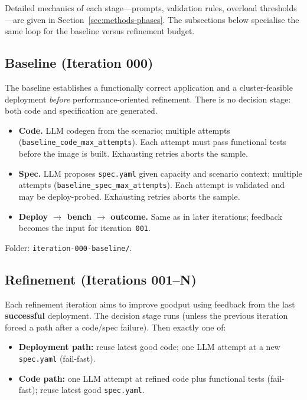 Detailed mechanics of each stage---prompts, validation rules, overload
thresholds---are given in Section~\ref{sec:methods-phases}.  The subsections
below specialise the same loop for the baseline versus refinement budget.


\subsection{Baseline (Iteration 000)}

The baseline establishes a functionally correct application and a
cluster-feasible deployment \emph{before} performance-oriented refinement.
There is no decision stage: both code and specification are generated.

\begin{itemize}
  \item \textbf{Code.} LLM codegen from the scenario; multiple attempts
        (\texttt{baseline\_code\_max\_attempts}).  Each attempt must pass
        functional tests before the image is built.  Exhausting retries aborts
        the sample.
  \item \textbf{Spec.} LLM proposes \texttt{spec.yaml} given capacity and
        scenario context; multiple attempts
        (\texttt{baseline\_spec\_max\_attempts}).  Each attempt is validated
        and may be deploy-probed.  Exhausting retries aborts the sample.
  \item \textbf{Deploy $\to$ bench $\to$ outcome.} Same as in later iterations;
        feedback becomes the input for iteration~\texttt{001}.
\end{itemize}

Folder: \texttt{iteration-000-baseline/}.


\subsection{Refinement (Iterations 001--N)}

Each refinement iteration aims to improve goodput using feedback from the last
\textbf{successful} deployment.  The decision stage runs (unless the previous
iteration forced a path after a code/spec failure).  Then exactly one of:

\begin{itemize}
  \item \textbf{Deployment path:} reuse latest good code; one LLM attempt at a
        new \texttt{spec.yaml} (fail-fast).
  \item \textbf{Code path:} one LLM attempt at refined code plus functional
        tests (fail-fast); reuse latest good \texttt{spec.yaml}.
\end{itemize}


